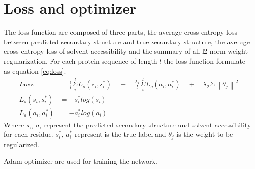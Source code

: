 \section{Loss and optimizer}
The loss function are composed of three parts, the average cross-entropy loss between predicted secondary structure and true secondary structure, the average cross-entropy loss of solvent accessibility and the summary of all l2 norm  weight regularization. For each protein sequence of length $l$ the loss function formulate as equation \ref{eq:loss}. 
\begin{subequations} 
    \begin{align}
    Loss &=\frac { 1 }{ l } \overset { l }{ \underset { i }{ \Sigma  }  } L_{ s }(s_{ i },s_{ i }^{ * })\quad +\quad \frac { \lambda_1 }{ l } \overset { l }{ \underset { i }{ \Sigma  }  } L_{ a }(a_{ i },a_{ i }^{ * }) \quad +\quad \lambda_2\Sigma\left\| \theta_j \right\|^2 \label{eq:loss}\\
    L_s(s_i, s_i^*) &= -s_i^*log(s_i)\\
    L_a(a_i, a_i^*) &= -a_i^*log(a_i)
    \end{align}	
\end{subequations}
Where $s_i$, $a_i$ represent the predicted secondary structure and solvent accessibility for each residue. $s_i^*$, $a_i^*$ represent is the true label and $\theta_j$ is the weight to be regularized. \par
Adam optimizer \cite{kingma2014adam} are used for training the network.






